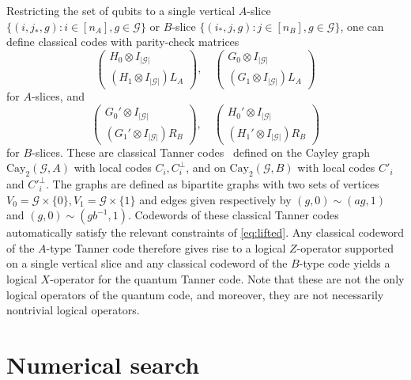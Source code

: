 \documentclass[a4paper,onecolumn,11pt]{quantumarticle}
\def\G{\mathcal{G}}
\begin{document}
Restricting the set of qubits to a single vertical $A$-slice $\{(i,j_*,g)  :  i \in [n_A], g\in \G\}$ or $B$-slice $\{({i_*}, j,g)  :  j \in [n_B], g\in \G\}$, one can define classical codes with parity-check matrices 
\[
\begin{pmatrix}H_0\otimes  I_{|\G|}\\ (H_1\otimes I_{|\G|})L_A\end{pmatrix},
\quad
\begin{pmatrix}G_0\otimes I_{|\G|}\\ (G_1\otimes I_{|\G|})L_A\end{pmatrix}
\]
for $A$-slices, and
\[
\begin{pmatrix}G_0'\otimes I_{|\G|}\\ (G_1'\otimes I_{|\G|})R_B\end{pmatrix},
\quad
\begin{pmatrix}H_0'\otimes I_{|\G|}\\ (H_1'\otimes I_{|\G|})R_B\end{pmatrix}
\]
for $B$-slices. These are classical Tanner codes~\cite{T81} defined on the Cayley graph $\mathrm{Cay}_2(\G,A)$ with local codes $C_i, C^\perp_i$, and on $\mathrm{Cay}_2(\G,B)$ with local codes $C'_i$ and $C'^\perp_i$. The graphs are defined as bipartite graphs with two sets of vertices $V_0 = \G \times \{0\}, V_1 = \G \times \{1\}$ and edges given respectively by $(g,0) \sim (ag,1)$ and $(g,0) \sim (gb^{-1},1)$.
Codewords of these classical Tanner codes automatically satisfy the relevant constraints of \eqref{eq:lifted}. Any classical codeword of the $A$-type Tanner code therefore gives rise to a logical $Z$-operator supported on a single vertical slice and any classical codeword of the $B$-type code yields a logical $X$-operator for the quantum Tanner code. Note that these are not the only logical operators of the quantum code, and moreover, they are not necessarily nontrivial logical operators. 
\\



\section{Numerical search}
\end{document}
